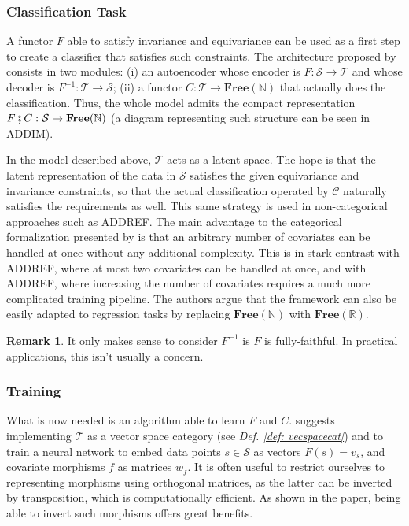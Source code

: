 \documentclass[11pt,a4paper,openright,twoside]{report}
\theoremstyle{plain}
\theoremstyle{definition}
\newtheorem{remark}[proposition]{Remark}
\begin{document}
\subsubsection{Classification Task}


A functor $F$ able to satisfy invariance and equivariance can be used as a first step to create a classifier that satisfies such constraints. The architecture proposed by \cite{chytasPoolingImageDatasets2024} consists in two modules: (i) an autoencoder whose encoder is $F: \mathcal{S} \to \mathcal{T}$ and whose decoder is $F^{-1}: \mathcal{T} \to \mathcal{S}$; (ii) a functor $C: \mathcal{T} \to \mathbf{Free}(\mathbb{N})$ that actually does the classification. Thus, the whole model admits the compact representation $F \fatsemi C: \mathcal{S} \to \mathbf{Free}(\mathbb{N})$ (a diagram representing such structure can be seen in ADDIM).


In the model described above, $\mathcal{T}$ acts as a latent space. The hope is that the latent representation of the data in $\mathcal{S}$ satisfies the given equivariance and invariance constraints, so that the actual classification operated by $\mathcal{C}$ naturally satisfies the requirements as well.
This same strategy is used in non-categorical approaches such as ADDREF. The main advantage to the categorical formalization presented by \cite{chytasPoolingImageDatasets2024} is that an arbitrary number of covariates can be handled at once without any additional complexity. This is in stark contrast with ADDREF, where at most two covariates can be handled at once, and with ADDREF, where increasing the number of covariates requires a much more complicated training pipeline. The authors argue that the framework can also be easily adapted to regression tasks by replacing $\mathbf{Free}(\mathbb{N})$ with $\mathbf{Free}(\mathbb{R})$.

\begin{remark}
  It only makes sense to consider $F^{-1}$ is $F$ is fully-faithful. In practical applications, this isn't usually a concern.
\end{remark}


\subsubsection{Training}

What is now needed is an algorithm able to learn $F$ and $C$. \cite{chytasPoolingImageDatasets2024} suggests implementing $\mathcal{T}$ as a vector space category (see \textit{Def. \ref{def: vecspacecat}}) and to train a neural network to embed data points $s \in \mathcal{S}$ as vectors $F(s) = v_s$, and covariate morphisms $f$ as matrices $w_f$. It is often useful to restrict ourselves to representing morphisms using orthogonal matrices, as the latter can be inverted by transposition, which is computationally efficient. As shown in the paper, being able to invert such morphisms offers great benefits.
\end{document}
